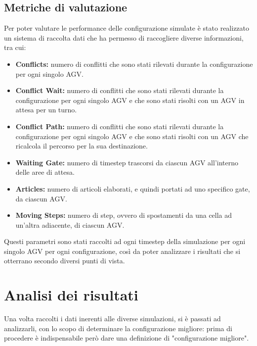 \documentclass[12pt]{article}
\begin{document}
\newpage

\subsection{Metriche di valutazione} \label{MetricheValutazione}
Per poter valutare le performance delle configurazione simulate è stato realizzato un sistema di raccolta dati che ha permesso di raccogliere diverse informazioni, tra cui:

\begin{itemize}
    \item \textbf{Conflicts:} numero di conflitti che sono stati rilevati durante la configurazione per ogni singolo AGV.
    \item \textbf{Conflict Wait:} numero di conflitti che sono stati rilevati durante la configurazione per ogni singolo AGV e che sono stati risolti con un AGV in attesa per un turno.
    \item \textbf{Conflict Path:} numero di conflitti che sono stati rilevati durante la configurazione per ogni singolo AGV e che sono stati risolti con un AGV che ricalcola il percorso per la sua destinazione.
    \item \textbf{Waiting Gate:} numero di timestep trascorsi da ciascun AGV all'interno delle aree di attesa.
    \item \textbf{Articles:}  numero di articoli elaborati, e quindi portati ad uno specifico gate, da ciascun AGV.
    \item \textbf{Moving Steps:} numero di step, ovvero di spostamenti da una cella ad un'altra adiacente, di ciascun AGV.
\end{itemize}

\noindent Questi parametri sono stati raccolti ad ogni timestep della simulazione per ogni singolo AGV per ogni configurazione, così da poter analizzare i risultati che si otterrano secondo diversi punti di vista.


\newpage
\section{Analisi dei risultati}
Una volta raccolti i dati inerenti alle diverse simulazioni, si è passati ad analizzarli, con lo scopo di determinare la configurazione migliore: prima di procedere è indispensabile però dare una definizione di "configurazione migliore". \\
\end{document}
